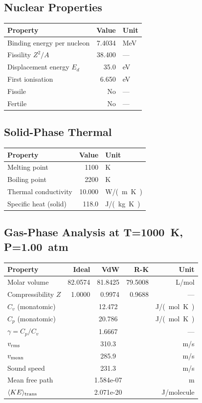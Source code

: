 \documentclass[11pt,a4paper]{article}
\begin{document}
\subsection{Nuclear Properties}
\begin{tabular}{lrl}
  \toprule
  Property & Value & Unit \\
  \midrule
  Binding energy per nucleon & 7.4034 & \si{MeV} \\
  Fissility $Z^2/A$ & 38.400 & --- \\
  Displacement energy $E_d$ & 35.0 & \si{eV} \\
  First ionisation & 6.650 & \si{eV} \\
  Fissile & No & --- \\
  Fertile & No & --- \\
  \bottomrule
\end{tabular}

\subsection{Solid-Phase Thermal}
\begin{tabular}{lrl}
  \toprule
  Property & Value & Unit \\
  \midrule
  Melting point & 1100 & \si{K} \\
  Boiling point & 2200 & \si{K} \\
  Thermal conductivity & 10.000 & \si{W/(m.K)} \\
  Specific heat (solid) & 118.0 & \si{J/(kg.K)} \\
  \bottomrule
\end{tabular}

\subsection{Gas-Phase Analysis at T=\SI{1000}{K}, P=\SI{1.00}{atm}}
\begin{tabular}{lrrrr}
  \toprule
  Property & Ideal & VdW & R-K & Unit \\
  \midrule
  Molar volume & 82.0574 & 81.8425 & 79.5008 & \si{L/mol} \\
  Compressibility $Z$ & 1.0000 & 0.9974 & 0.9688 & --- \\
  \midrule
  $C_v$ (monatomic) & \multicolumn{3}{c}{12.472} & \si{J/(mol.K)} \\
  $C_p$ (monatomic) & \multicolumn{3}{c}{20.786} & \si{J/(mol.K)} \\
  $\gamma = C_p/C_v$ & \multicolumn{3}{c}{1.6667} & --- \\
  $v_{\rm rms}$ & \multicolumn{3}{c}{310.3} & \si{m/s} \\
  $v_{\rm mean}$ & \multicolumn{3}{c}{285.9} & \si{m/s} \\
  Sound speed & \multicolumn{3}{c}{231.3} & \si{m/s} \\
  Mean free path & \multicolumn{3}{c}{1.584e-07} & \si{m} \\
  $\langle KE \rangle_{\rm trans}$ & \multicolumn{3}{c}{2.071e-20} & \si{J/molecule} \\
  \bottomrule
\end{tabular}

\newpage
\end{document}
